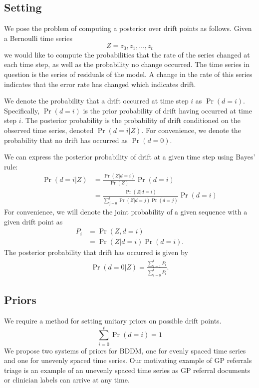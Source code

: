 \subsection{Setting}

We pose the problem of computing a posterior over drift points as follows. Given a Bernoulli time series 
\begin{equation}
    Z=z_0,z_1,\dots,z_t
\end{equation}
we would like to compute the probabilities that the rate of the series changed at each time step, as well as the probability no change occurred. The time series in question is the series of residuals of the model. A change in the rate of this series indicates that the error rate has changed which indicates drift.

We denote the probability that a drift occurred at time step $i$ as $\Pr(d=i)$. Specifically, $\Pr(d=i)$ is the prior probability of drift having occurred at time step $i$. The posterior probability is the probability of drift conditioned on the observed time series, denoted $\Pr(d=i|Z)$. For convenience, we denote the probability that no drift has occurred as $\Pr(d=0)$.


We can express the posterior probability of drift at a given time step using Bayes' rule:
\begin{align}
  \Pr(d=i|Z) &= \frac{\Pr(Z|d=i)}{\Pr(Z)}\Pr(d=i) \\
  &= \frac{\Pr(Z|d=i)}{\sum_{j=0}^t\Pr(Z|d=j)\Pr(d=j)}\Pr(d=i) \label{eq:posterior}
\end{align}
For convenience, we will denote the joint probability of a given sequence with a given drift point as
\begin{align}
  P_i &= \Pr(Z, d=i) \\
  &= \Pr(Z|d=i)\Pr(d=i).
\end{align}
The posterior probability that drift has occurred is given by
\begin{align}
  \Pr(d=0|Z) = \frac{\sum_{i=1}^t P_i}{\sum_{i=0}^t P_i}.
\end{align}

\subsection{Priors}

We require a method for setting unitary priors on possible drift points.
\begin{equation}
  \sum_{i=0}^t \Pr(d=i) = 1
\end{equation}
We propose two systems of priors for BDDM, one for evenly spaced time series and one for unevenly spaced time series. Our motivating example of GP referrals triage is an example of an unevenly spaced time series as GP referral documents or clinician labels can arrive at any time.

